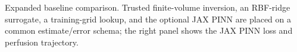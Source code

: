 \caption{Expanded baseline comparison. Trusted finite-volume inversion, an RBF-ridge surrogate, a training-grid lookup, and the optional JAX PINN are placed on a common estimate/error schema; the right panel shows the JAX PINN loss and perfusion trajectory.}\label{fig:baseline-comparison-expanded}
